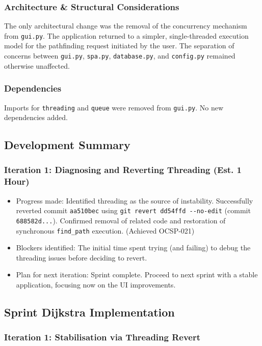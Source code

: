 \subsubsection{Architecture \& Structural Considerations}
The only architectural change was the removal of the concurrency mechanism from \verb|gui.py|. The application returned to a simpler, single-threaded execution model for the pathfinding request initiated by the user. The separation of concerns between \verb|gui.py|, \verb|spa.py|, \verb|database.py|, and \verb|config.py| remained otherwise unaffected.

\subsubsection{Dependencies}
Imports for \verb|threading| and \verb|queue| were removed from \verb|gui.py|. No new dependencies added.

\subsection{Development Summary}

\subsubsection{Iteration 1: Diagnosing and Reverting Threading (Est. 1 Hour)}
\begin{itemize}
	\item Progress made: Identified threading as the source of instability. Successfully reverted commit \verb|aa510bec| using \verb|git revert dd54ffd --no-edit| (commit \verb|688582d...|). Confirmed removal of related code and restoration of synchronous \verb|find_path| execution. (Achieved OCSP-021)
	\item Blockers identified: The initial time spent trying (and failing) to debug the threading issues before deciding to revert.
	\item Plan for next iteration: Sprint complete. Proceed to next sprint with a stable application, focusing now on the UI improvements.
\end{itemize}

\clearpage
\subsection{Sprint Dijkstra Implementation}

\subsubsection{Iteration 1: Stabilisation via Threading Revert}

